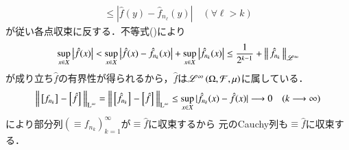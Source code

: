 \begin{prf}
\begin{description}
\begin{align}
				\leq \left| \hat{f}(y) - \hat{f}_{n_\ell}(y) \right|
				\quad (\forall \ell > k)
			\end{align}
			が従い各点収束に反する．不等式()により
			\begin{align}
				\operatorname*{sup}_{x \in X} \left| \hat{f}(x) \right| 
				< \operatorname*{sup}_{x \in X} \left| \hat{f}(x) - \hat{f}_{n_k}(x) \right| + \operatorname*{sup}_{x \in X} \left| \hat{f}_{n_k}(x) \right| 
				\leq \frac{1}{2^{k-1}} + \left\|\, \hat{f}_{n_k}\, \right\|_{\mathscr{L}^\infty}
			\end{align}
			が成り立ち$\hat{f}$の有界性が得られるから，$\hat{f}$は$\mathscr{L}^{\infty} \left(\Omega,\mathcal{F},\mu\right)$に属している．
			\begin{align}
				\left\|\, \left[f_{n_k}\right]_{} - \left[\hat{f}\right]_{}\, \right\|_{\mathrm{L}^\infty}
				= \left\|\, \left[\hat{f}_{n_k}\right]_{} - \left[\hat{f}\right]_{}\, \right\|_{\mathrm{L}^\infty}
				\leq \operatorname*{sup}_{x \in X} |\hat{f}_{n_k}(x) - \hat{f}(x)|
				\longrightarrow 0 \quad (k \longrightarrow \infty)
			\end{align}
			により部分列$\left( \equiv{f_{n_k}}{} \right)_{k=1}^{\infty}$が$\equiv{\hat{f}}{}$に収束するから
			元のCauchy列も$\equiv{\hat{f}}{}$に収束する．
			

\end{description}
\end{prf}
